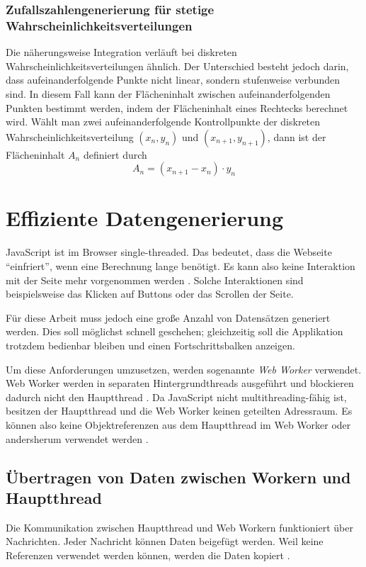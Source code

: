 \subsubsection{Zufallszahlengenerierung für stetige Wahrscheinlichkeitsverteilungen}

Die näherungsweise Integration verläuft bei diskreten Wahrscheinlichkeitsverteilungen ähnlich. Der Unterschied besteht jedoch darin, dass aufeinanderfolgende Punkte nicht linear, sondern stufenweise verbunden sind. In diesem Fall kann der Flächeninhalt zwischen aufeinanderfolgenden Punkten bestimmt werden, indem der Flächeninhalt eines Rechtecks berechnet wird.
Wählt man zwei aufeinanderfolgende Kontrollpunkte der diskreten Wahrscheinlichkeitsverteilung $(x_n,y_n)$ und $(x_{n+1},y_{n+1})$, dann ist der Flächeninhalt $A_n$ definiert durch
$$A_n=(x_{n+1}-x_n) \cdot y_n$$

\section{Effiziente Datengenerierung}
JavaScript ist im Browser single-threaded. Das bedeutet, dass die Webseite \enquote{einfriert}, wenn eine Berechnung lange benötigt. Es kann also keine Interaktion mit der Seite mehr vorgenommen werden \cite{googledev:webworkers}. Solche Interaktionen sind beispielsweise das Klicken auf Buttons oder das Scrollen der Seite.

Für diese Arbeit muss jedoch eine große Anzahl von Datensätzen generiert werden. Dies soll möglichst schnell geschehen; gleichzeitig soll die Applikation trotzdem bedienbar bleiben und einen Fortschrittsbalken anzeigen.

Um diese Anforderungen umzusetzen, werden sogenannte \textit{Web Worker} verwendet. Web Worker werden in separaten Hintergrundthreads ausgeführt und blockieren dadurch nicht den Hauptthread \cite{mdn:webworkers}. Da JavaScript nicht multithreading-fähig ist, besitzen der Hauptthread und die Web Worker keinen geteilten Adressraum. Es können also keine Objektreferenzen aus dem Hauptthread im Web Worker oder andersherum verwendet werden \cite{mdn:webworkers}.

\subsection{Übertragen von Daten zwischen Workern und Hauptthread}

Die Kommunikation zwischen Hauptthread und Web Workern funktioniert über Nachrichten. Jeder Nachricht können Daten beigefügt werden. Weil keine Referenzen verwendet werden können, werden die Daten kopiert \cite{mdn:webworkers}.

